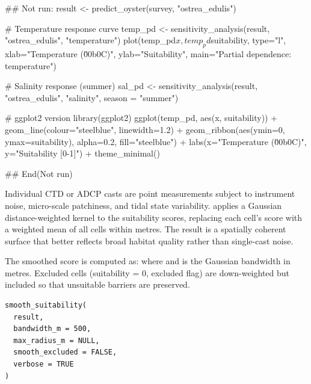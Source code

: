 \documentclass[a4paper]{book}
\begin{document}
%
\begin{Examples}
\begin{ExampleCode}
## Not run: 
result <- predict_oyster(survey, "ostrea_edulis")

# Temperature response curve
temp_pd <- sensitivity_analysis(result, "ostrea_edulis", "temperature")
plot(temp_pd$x, temp_pd$suitability, type="l",
     xlab="Temperature (\u00b0C)", ylab="Suitability",
     main="Partial dependence: temperature")

# Salinity response (summer)
sal_pd <- sensitivity_analysis(result, "ostrea_edulis", "salinity",
                               season = "summer")

# ggplot2 version
library(ggplot2)
ggplot(temp_pd, aes(x, suitability)) +
  geom_line(colour="steelblue", linewidth=1.2) +
  geom_ribbon(aes(ymin=0, ymax=suitability), alpha=0.2, fill="steelblue") +
  labs(x="Temperature (\u00b0C)", y="Suitability [0-1]") +
  theme_minimal()

## End(Not run)
\end{ExampleCode}
\end{Examples}
%
\begin{Description}
Individual CTD or ADCP casts are point measurements subject to instrument
noise, micro-scale patchiness, and tidal state variability. 
applies a Gaussian distance-weighted kernel to the suitability scores, replacing
each cell's score with a weighted mean of all cells within  metres.
The result is a spatially coherent surface that better reflects broad habitat
quality rather than single-cast noise.

The smoothed score is computed as:
where  and \eqn{\sigma}{} is the
Gaussian bandwidth in metres. Excluded cells (suitability = 0, excluded flag)
are down-weighted but included so that unsuitable barriers are preserved.
\end{Description}
%
\begin{Usage}
\begin{verbatim}
smooth_suitability(
  result,
  bandwidth_m = 500,
  max_radius_m = NULL,
  smooth_excluded = FALSE,
  verbose = TRUE
)
\end{verbatim}
\end{Usage}
%
\end{document}
